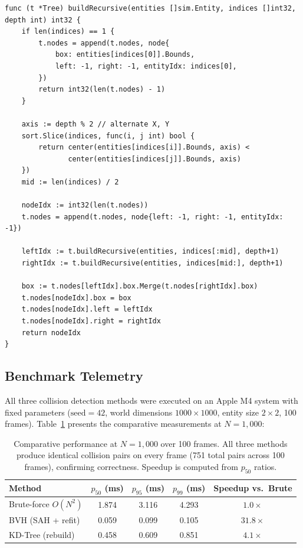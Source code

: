 \documentclass[12pt]{article}
\begin{document}
\begin{lstlisting}[style=gostyle, caption={KD-Tree spatial-median construction (\texttt{pkg/kdtree/kdtree.go}, excerpt)}]
func (t *Tree) buildRecursive(entities []sim.Entity, indices []int32, depth int) int32 {
    if len(indices) == 1 {
        t.nodes = append(t.nodes, node{
            box: entities[indices[0]].Bounds,
            left: -1, right: -1, entityIdx: indices[0],
        })
        return int32(len(t.nodes) - 1)
    }

    axis := depth % 2 // alternate X, Y
    sort.Slice(indices, func(i, j int) bool {
        return center(entities[indices[i]].Bounds, axis) <
               center(entities[indices[j]].Bounds, axis)
    })
    mid := len(indices) / 2

    nodeIdx := int32(len(t.nodes))
    t.nodes = append(t.nodes, node{left: -1, right: -1, entityIdx: -1})

    leftIdx := t.buildRecursive(entities, indices[:mid], depth+1)
    rightIdx := t.buildRecursive(entities, indices[mid:], depth+1)

    box := t.nodes[leftIdx].box.Merge(t.nodes[rightIdx].box)
    t.nodes[nodeIdx].box = box
    t.nodes[nodeIdx].left = leftIdx
    t.nodes[nodeIdx].right = rightIdx
    return nodeIdx
}
\end{lstlisting}

\subsection{Benchmark Telemetry}

All three collision detection methods were executed on an Apple M4 system with fixed parameters ($\text{seed}=42$, world dimensions $1000 \times 1000$, entity size $2 \times 2$, 100 frames). Table~\ref{tab:benchmarks} presents the comparative measurements at $N = 1{,}000$:

\begin{table}[ht]
\centering
\small
\begin{tabular}{lcccc}
\toprule
\textbf{Method} & \textbf{$p_{50}$ (ms)} & \textbf{$p_{95}$ (ms)} & \textbf{$p_{99}$ (ms)} & \textbf{Speedup vs.\ Brute} \\
\midrule
Brute-force $O(N^2)$ & 1.874 & 3.116 & 4.293 & $1.0\times$ \\
BVH (SAH + refit)     & 0.059 & 0.099 & 0.105 & $31.8\times$ \\
KD-Tree (rebuild)     & 0.458 & 0.609 & 0.851 & $4.1\times$ \\
\bottomrule
\end{tabular}
\caption{Comparative performance at $N = 1{,}000$ over 100 frames. All three methods produce identical collision pairs on every frame (751 total pairs across 100 frames), confirming correctness. Speedup is computed from $p_{50}$ ratios.}
\label{tab:benchmarks}
\end{table}
\end{document}
